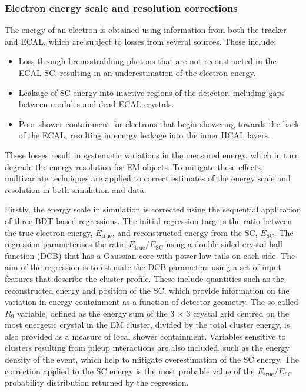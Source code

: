 \subsubsection{Electron energy scale and resolution corrections}

The energy of an electron is obtained using information from both the tracker and ECAL, which are subject to losses from several sources. These include:

\begin{itemize}
    \item Loss through bremsstrahlung photons that are not reconstructed in the ECAL SC, resulting in an underestimation of the electron energy.
    \item Leakage of SC energy into inactive regions of the detector, including gaps between modules and dead ECAL crystals.
    \item Poor shower containment for electrons that begin showering towards the back of the ECAL, resulting in energy leakage into the inner HCAL layers.
\end{itemize}

\noindent These losses result in systematic variations in the measured energy, which in turn degrade the energy resolution for EM objects. To mitigate these effects, multivariate techniques are applied to correct estimates of the energy scale and resolution in both simulation and data.    

Firstly, the energy scale in simulation is corrected using the sequential application of three BDT-based regressions. The initial regression targets the ratio between the true electron energy, $E_{\mathrm{true}}$, and reconstructed energy from the SC, $E_{\mathrm{SC}}$. The regression parameterises the ratio $E_{\mathrm{true}}/E_{\mathrm{SC}}$ using a double-sided crystal ball function (DCB) that has a Gaussian core with power law tails on each side. The aim of the regression is to estimate the DCB parameters using a set of input features that describe the cluster profile. These include quantities such as the reconstructed energy and position of the SC, which provide information on the variation in energy containment as a function of detector geometry.
The so-called $R_{9}$ variable, defined as the energy sum of the 3 $\times$ 3 crystal grid centred on the most energetic crystal in the EM cluster, divided by the total cluster energy, is also provided as a measure of local shower containment.
Variables sensitive to clusters resulting from pileup interactions are also included, such as the energy density of the event, which help to mitigate overestimation of the SC energy. 
The correction applied to the SC energy is the most probable value of the $E_{\mathrm{true}}/E_{\mathrm{SC}}$ probability distribution returned by the regression.

